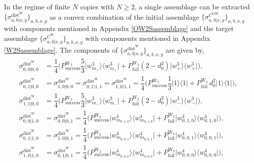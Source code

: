 \documentclass[reprint,superscriptaddress,nofootinbib,amsmath,amssymb,aps,pra,longbibliography]{revtex4-1}
\begin{document}
\begin{widetext}
In the regime of finite $N$ copies with $N \geq 2$, a single assemblage can be extracted $\{\sigma_{a,b|x,y}^{\text{dist}^{\text{W}}}\}_{a,b,x,y}$ as a convex combination of the initial assemblage $\{\sigma_{a,b|x,y}^{C^{\text{GW}}}\}_{a,b,x,y}$ with components mentioned in Appendix \ref{OW2Sassemblage} and the target assemblage $\{\sigma_{a,b|x,y}^{C^{\text{W}}}\}_{a,b,x,y}$ with components mentioned in Appendix \ref{W2Sassemblage}. The components of $\{\sigma_{a,b|x,y}^{\text{dist}^{\text{W}}}\}_{a,b,x,y}$ are given by,
\begin{align}
	\sigma_{0,0|0,0}^{\text{dist}^{\text{W}}} &= \dfrac{1}{4} \Bigg(   P_{\text{success}}^{\text{W}_2} \dfrac{5 }{3} \Big| w_{m_{+}}^3 \Big\rangle \Big\langle w_{m_{+}}^3 \Big| + P_{\text{fail}}^{\text{W}_2} (2-d_0^2) \Big| w_{+}^3 \Big\rangle \Big\langle w_{+}^3 \Big| \Bigg), \nonumber \\
	\sigma_{0,1|0,0}^{\text{dist}^{\text{W}}} &=\sigma_{1,0|0,0}^{\text{dist}^{\text{W}}} = \sigma_{0,1|1,1}^{\text{dist}^{\text{W}}} = \sigma_{1,0|1,1}^{\text{dist}^{\text{W}}} = \dfrac{1}{4} \Bigg( P_{\text{success}}^{\text{W}_2} \dfrac{1}{3} \Big| 1 \Big\rangle \Big\langle 1 \Big| + P_{\text{fail}}^{\text{W}_2} \, d_0^2 \Big| 1 \Big\rangle \Big\langle 1 \Big| \Bigg), \nonumber \\
	\sigma_{1,1|0,0}^{\text{dist}^{\text{W}}} &= \dfrac{1}{4} \Bigg( P_{\text{success}}^{\text{W}_2} \dfrac{5}{3} \Big| w_{m_{-}}^3 \Big\rangle \Big\langle w_{m_{-}}^3 \Big| + P_{\text{fail}}^{\text{W}_2} (2-d_0^2) \Big| w_{-}^3 \Big\rangle \Big\langle w_{-}^3 \Big| \Bigg), \nonumber \\
	  \sigma_{0,0|1,0}^{\text{dist}^{\text{W}}} &=  \sigma_{0,0|0,1}^{\text{dist}^{\text{W}}} = \dfrac{1}{4} \Bigg( P_{\text{success}}^{\text{W}_2} \Big| w_{m_{0,1,0}}^4 \Big\rangle \Big\langle w_{m_{0,1,0}}^4 \Big| + P_{\text{fail}}^{\text{W}_2} \Big| w_{0,1,0}^4 \Big\rangle \Big\langle w_{0,1,0}^4 \Big| \Bigg), \nonumber \\
	   \sigma_{0,1|1,0}^{\text{dist}^{\text{W}}} &= \sigma_{1,0|0,1} ^{\text{dist}^{\text{W}}}  = \dfrac{1}{4} \Bigg( P_{\text{success}}^{\text{W}_2} \Big| w_{m_{0,0,1}}^4 \Big\rangle \Big\langle w_{m_{0,0,1}}^4 \Big| + P_{\text{fail}}^{\text{W}_2} \Big| w_{0,0,1}^4 \Big\rangle \Big\langle w_{0,0,1}^4 \Big| \Bigg),  \nonumber \\
	\sigma_{1,0|1,0}^{\text{dist}^{\text{W}}} &= \sigma_{0,1|0,1}^{\text{dist}^{\text{W}}} = \dfrac{1}{4} \Bigg( P_{\text{success}}^{\text{W}_2} \Big| w_{m_{0,0,0}}^4 \Big\rangle \Big\langle w_{m_{0,0,0}}^4 \Big| + P_{\text{fail}}^{\text{W}_2} \Big| w_{0,0,0}^4 \Big\rangle \Big\langle w_{0,0,0}^4 \Big| \Bigg),  \nonumber \\

\end{align}
\end{widetext}
\end{document}
